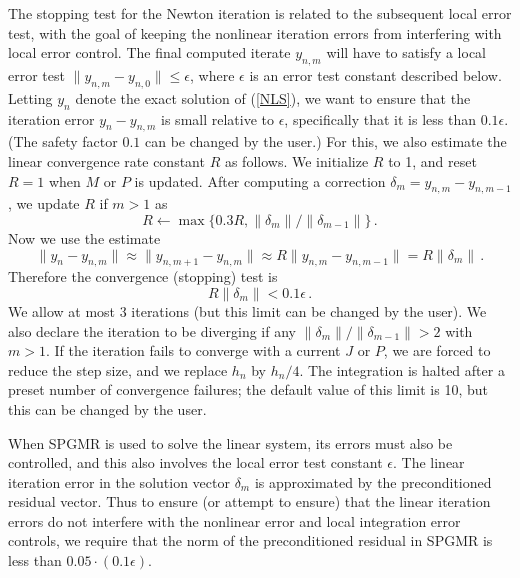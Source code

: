 The stopping test for the Newton iteration is related to the
subsequent local error test, with the goal of keeping the nonlinear
iteration errors from interfering with local error control.  The final
computed iterate $y_{n,m}$ will have to satisfy a local error test
$\|y_{n,m} - y_{n,0}\| \leq \epsilon$, where $\epsilon$ is an error
test constant described below.  Letting $y_n$ denote the exact
solution of (\ref{NLS}), we want to ensure that the iteration error
$y_n-y_{n,m}$ is small relative to $\epsilon$, specifically that it is
less than $0.1 \epsilon$.  (The safety factor $0.1$ can be changed by
the user.)  For this, we also estimate the linear convergence rate
constant $R$ as follows.  We initialize $R$ to 1, and reset $R = 1$
when $M$ or $P$ is updated.  After computing a correction
$\delta_m = y_{n,m} - y_{n,m-1}$, we update $R$ if $m > 1$ as
\begin{equation*}
  R \leftarrow \max\{0.3R , \|\delta_m\| / \|\delta_{m-1}\| \} \, .
\end{equation*}
Now we use the estimate
\begin{equation*}
  \| y_n - y_{n,m} \| \approx \| y_{n,m+1} - y_{n,m} \|
  \approx R \| y_{n,m} - y_{n,m-1} \|  =  R \|\delta_m \| \, .
\end{equation*}
Therefore the convergence (stopping) test is
\begin{equation*}
  R \|\delta_m \| < 0.1 \epsilon \, .
\end{equation*}
We allow at most 3 iterations (but this limit can be changed by the
user).  We also declare the iteration to be diverging if any
$\|\delta_m\|/\|\delta_{m-1}\| > 2$ with $m > 1$. If the iteration
fails to converge with a current $J$ or $P$, we are forced to reduce
the step size, and we replace $h_n$ by $h_n/4$.  The integration is
halted after a preset number of convergence failures; the default
value of this limit is 10, but this can be changed by the user.

When SPGMR is used to solve the linear system, its errors must also be
controlled, and this also involves the local error test constant
$\epsilon$.  The linear iteration error in the solution vector
$\delta_m$ is approximated by the preconditioned residual vector.
Thus to ensure (or attempt to ensure) that the linear iteration errors
do not interfere with the nonlinear error and local integration error
controls, we require that the norm of the preconditioned residual in
SPGMR is less than $0.05 \cdot (0.1 \epsilon)$.

